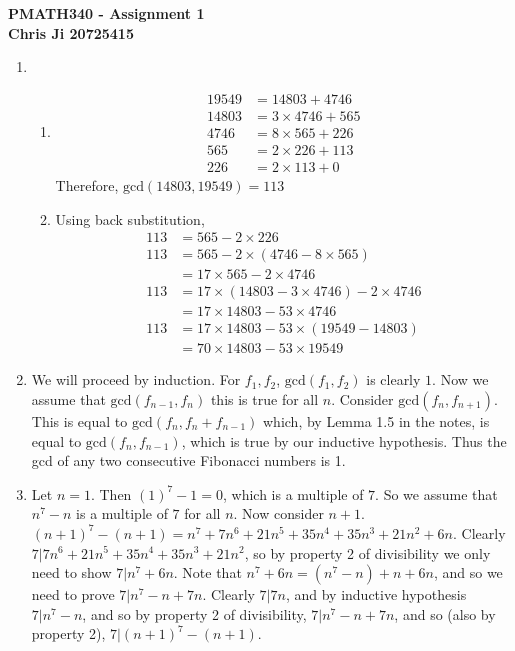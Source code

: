 \documentclass[10pt,english]{article}
\begin{document}
\noindent \begin{center}
\textbf{\large{}PMATH340 - Assignment 1}\\
\textbf{\large{}Chris Ji 20725415}
\par\end{center}{\large \par}
\medskip{}

\begin{enumerate}
\item \begin{enumerate}
    \item \begin{align*}19549&= 14803 + 4746 \\ 14803 &= 3\times4746 + 565 \\ 4746 &= 8\times 565+226\\ 565&=2\times226+113\\226&=2\times113+0\end{align*} Therefore, $\text{gcd}(14803,19549)=113$
    \item Using back substitution, 
    \begin{align*}113&=565-2\times226\\ 
    113&=565 -2\times(4746-8\times565)\\
    &=17\times565-2\times4746\\
    113&=17\times(14803-3\times4746)-2\times4746\\
    &=17\times14803-53\times4746\\
    113&=17\times14803-53\times(19549-14803)\\ 
    &=70\times14803-53\times19549\end{align*}
\end{enumerate}

\pagebreak
\item We will proceed by induction. For $f_1,f_2$, $\text{gcd}(f_1,f_2)$ is clearly $1$. Now we assume that $\text{gcd}(f_{n-1},f_n)$ this is true for all $n$. Consider $\text{gcd}(f_n,f_{n+1})$. This is equal to $\text{gcd}(f_{n},f_{n}+f_{n-1})$ which, by Lemma 1.5 in the notes, is equal to $\text{gcd}(f_{n},f_{n-1})$, which is true by our inductive hypothesis. Thus the gcd of any two consecutive Fibonacci numbers is 1.

\pagebreak
\item Let $n=1$. Then $(1)^7-1=0$, which is a multiple of $7$. So we assume that $n^7-n$ is a multiple of $7$ for all $n$. Now consider $n+1$. $(n+1)^7-(n+1)=n^7+7n^6+21n^5+35n^4+35n^3+21n^2+6n$. Clearly $7 | 7n^6+21n^5+35n^4+35n^3+21n^2$, so by property 2 of divisibility we only need to show $7|n^7+6n$. Note that $n^7+6n=(n^7-n)+n+6n$, and so we need to prove $7|n^7-n+7n$. Clearly $7|7n$, and by inductive hypothesis $7|n^7-n$, and so by property 2 of divisibility, $7|n^7-n+7n$, and so (also by property 2), $7|(n+1)^7-(n+1)$.


\end{enumerate}
\end{document}
